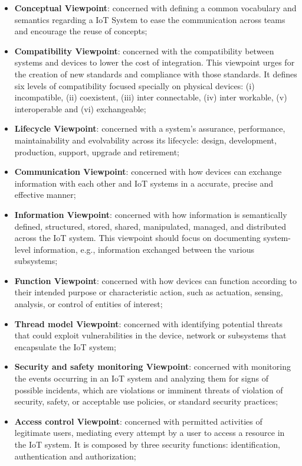 \begin{itemize}
    \item \textbf{Conceptual Viewpoint}: concerned with defining a common vocabulary and semantics regarding a \gls{IoT} System to ease the communication across teams and encourage the reuse of concepts;
    \item \textbf{Compatibility Viewpoint}: concerned with the compatibility between systems and devices to lower the cost of integration. This viewpoint urges for the creation of new standards and compliance with those standards. It defines six levels of compatibility focused specially on physical devices: (i) incompatible, (ii) coexistent, (iii) inter connectable, (iv) inter workable, (v) interoperable and (vi) exchangeable;
    \item \textbf{Lifecycle Viewpoint}: concerned with a system's assurance, performance, maintainability and evolvability across its lifecycle: design, development, production, support, upgrade and retirement; 
    \item \textbf{Communication Viewpoint}: concerned with how devices can exchange information with each other and \gls{IoT} systems in a accurate, precise and effective manner;
    \item \textbf{Information Viewpoint}: concerned with how information is semantically defined, structured, stored, shared, manipulated, managed, and distributed across the IoT system. This viewpoint should focus on documenting system-level information, e.g., information exchanged between the various subsystems;
    \item \textbf{Function Viewpoint}: concerned with how devices can function according to their intended purpose or characteristic action, such as actuation, sensing, analysis, or control of entities of interest; 
    \item \textbf{Thread model Viewpoint}: concerned with identifying potential threats that could exploit vulnerabilities in the device, network or subsystems that encapsulate the \gls{IoT} system;
    \item \textbf{Security and safety monitoring Viewpoint}: concerned with monitoring the events occurring in an \gls{IoT} system and analyzing them for signs of possible incidents, which are violations or imminent threats of violation of security, safety, or acceptable use policies, or standard security practices;
    \item \textbf{Access control Viewpoint}: concerned with permitted activities of legitimate users, mediating every attempt by a user to access a resource in the IoT system. It is composed by three security functions: identification, authentication and authorization;

\end{itemize}
